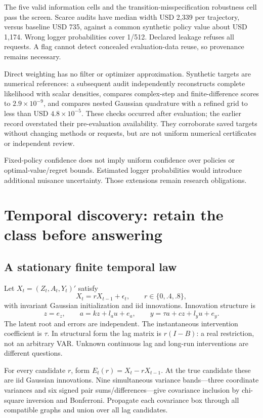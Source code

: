 The five valid information cells and the transition-misspecification robustness cell pass the screen. Scarce audits have median width USD 2,339 per trajectory, versus baseline USD 735, against a common synthetic policy value about USD 1,174. Wrong logger probabilities cover 1/512. Declared leakage refuses all requests. A flag cannot detect concealed evaluation-data reuse, so provenance remains necessary.

Direct weighting has no filter or optimizer approximation. Synthetic targets are numerical references: a subsequent audit independently reconstructs complete likelihood with scalar densities, compares complex-step and finite-difference scores to $2.9\times10^{-9}$, and compares nested Gaussian quadrature with a refined grid to less than USD $4.8\times10^{-5}$. These checks occurred after evaluation; the earlier record overstated their pre-evaluation availability. They corroborate saved targets without changing methods or requests, but are not uniform numerical certificates or independent review.

Fixed-policy confidence does not imply uniform confidence over policies or optimal-value/regret bounds. Estimated logger probabilities would introduce additional nuisance uncertainty. Those extensions remain research obligations.

\section{Temporal discovery: retain the class before answering}
\subsection{A stationary finite temporal law}
Let $X_t=(Z_t,A_t,Y_t)'$ satisfy
\[
 X_t=rX_{t-1}+\epsilon_t,\qquad r\in\{0,.4,.8\},
\]
with invariant Gaussian initialization and iid innovations. Innovation structure is
\[
 z=e_z,\qquad a=kz+l_au+e_a,\qquad y=\tau a+cz+l_yu+e_y.
\]
The latent root and errors are independent. The instantaneous intervention coefficient is $\tau$. In structural form the lag matrix is $r(I-B)$: a real restriction, not an arbitrary VAR. Unknown continuous lag and long-run interventions are different questions.

For every candidate $r$, form $E_t(r)=X_t-rX_{t-1}$. At the true candidate these are iid Gaussian innovations. Nine simultaneous variance bands---three coordinate variances and six signed pair sums/differences---give covariance inclusion by chi-square inversion and Bonferroni. Propagate each covariance box through all compatible graphs and union over all lag candidates.

